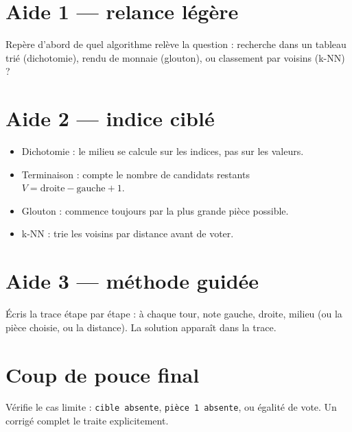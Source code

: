 \documentclass[a4paper,11pt]{article}
\begin{document}

\section*{Aide 1 — relance légère}
Repère d'abord de quel algorithme relève la question : recherche dans un tableau trié (dichotomie), rendu de monnaie (glouton), ou classement par voisins (k-NN) ?

\section*{Aide 2 — indice ciblé}
\begin{itemize}[nosep]
  \item Dichotomie : le milieu se calcule sur les indices, pas sur les valeurs.
  \item Terminaison : compte le nombre de candidats restants $V = \text{droite} - \text{gauche} + 1$.
  \item Glouton : commence toujours par la plus grande pièce possible.
  \item k-NN : trie les voisins par distance avant de voter.
\end{itemize}

\section*{Aide 3 — méthode guidée}
Écris la trace étape par étape : à chaque tour, note gauche, droite, milieu (ou la pièce choisie, ou la distance). La solution apparaît dans la trace.

\section*{Coup de pouce final}
Vérifie le cas limite : \texttt{cible absente}, \texttt{pièce 1 absente}, ou égalité de vote. Un corrigé complet le traite explicitement.
\end{document}

